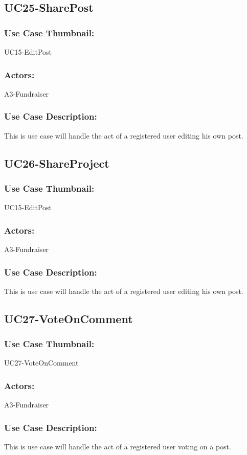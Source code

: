\documentclass[11pt, openany]{report}
\begin{document}
\subsection{UC25-SharePost}
\label{sUC25}
\subsubsection*{Use Case Thumbnail:}
UC15-EditPost
\subsubsection*{Actors:}
A3-Fundraiser
\subsubsection*{Use Case Description:}
This is use case will handle the act of a registered user editing his own post. 

\subsection{UC26-ShareProject}
\label{sUC26}
\subsubsection*{Use Case Thumbnail:}
UC15-EditPost
\subsubsection*{Actors:}
A3-Fundraiser
\subsubsection*{Use Case Description:}
This is use case will handle the act of a registered user editing his own post. 

\subsection{UC27-VoteOnComment}
\label{sUC27}
\subsubsection*{Use Case Thumbnail:}
UC27-VoteOnComment
\subsubsection*{Actors:}
A3-Fundraiser
\subsubsection*{Use Case Description:}
This is use case will handle the act of a registered user voting on a post.
\end{document}
